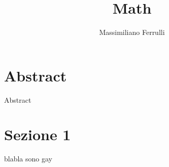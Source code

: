 \documentclass{article}
\title{Math}
\author{Massimiliano Ferrulli}
\date{}
\begin{document}
\maketitle

\section*{Abstract}
Abstract

\pagebreak

\tableofcontents
\pagebreak

\section{Sezione 1}
blabla sono gay
\end{document}
